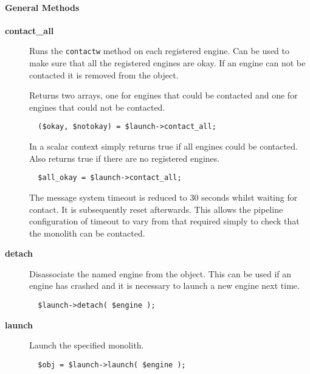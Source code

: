 \paragraph*{General Methods\label{ORAC::Msg::EngineLaunch_General_Methods}}
\begin{description}

\item[{\textbf{contact\_all}}] \mbox{}

Runs the \texttt{contactw} method on each registered engine. Can be used
to make sure that all the registered engines are okay.
If an engine can not be contacted it is removed from the object.



Returns two arrays, one for engines that could be contacted and
one for engines that could not be contacted.

\begin{verbatim}
  ($okay, $notokay) = $launch->contact_all;
\end{verbatim}


In a scalar context simply returns true if all engines could be
contacted. Also returns true if there are no registered engines.

\begin{verbatim}
  $all_okay = $launch->contact_all;
\end{verbatim}


The message system timeout is reduced to 30 seconds whilst
waiting for contact. It is subsequently reset afterwards. This
allows the pipeline configuration of timeout to vary from that
required simply to check that the monolith can be contacted.


\item[{\textbf{detach}}] \mbox{}

Disassociate the named engine from the object. This can be used
if an engine has crashed and it is necessary to launch a new
engine next time.

\begin{verbatim}
  $launch->detach( $engine );
\end{verbatim}

\item[{\textbf{launch}}] \mbox{}

Launch the specified monolith.

\begin{verbatim}
  $obj = $launch->launch( $engine );
\end{verbatim}



\end{description}
